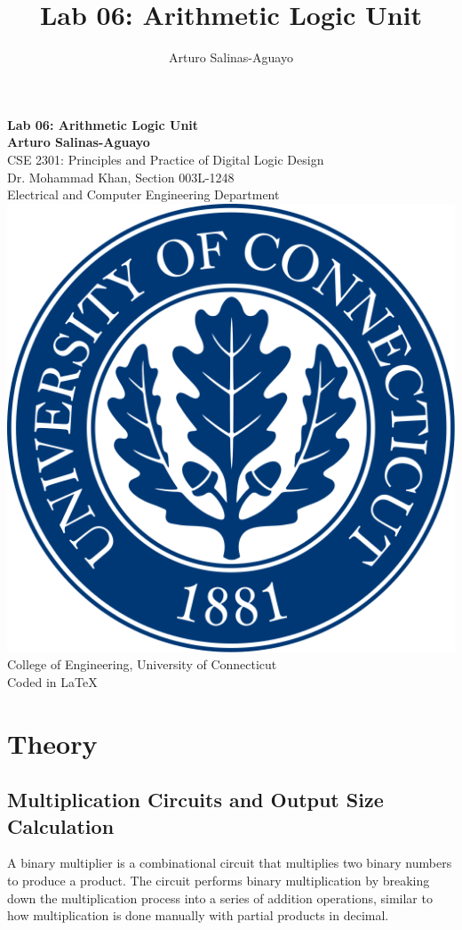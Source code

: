 \documentclass[12pt]{article}
\author{Arturo Salinas-Aguayo}
\title{Lab 06: Arithmetic Logic Unit}
\begin{document}
\newcommand{\closure}[2][3]{%
	{}\mkern#1mu\overline{\mkern-#1mu#2}}
\newcommand\ncoverline[1]{\mkern1mu\overline{\mkern-1mu#1\mkern-1mu}\mkern1mu}
\begin{titlepage}
	\centering
	\vspace*{3cm}
	\huge\textbf{Lab 06: Arithmetic Logic Unit}\\
	\vspace{5cm}
	\Large\textbf{Arturo Salinas-Aguayo}\\
	\normalsize
	CSE 2301: Principles and Practice of Digital Logic Design\\
	Dr. Mohammad Khan, Section 003L-1248\\
	Electrical and Computer Engineering Department
	\vfill
	\includegraphics[scale=0.1]{uconnlogo}\\
	College of Engineering, University of Connecticut\\
	\scriptsize{Coded in \LaTeX}
	\vspace*{1cm}
\end{titlepage}
\section*{Theory}
\subsection*{Multiplication Circuits and Output Size Calculation}
A binary multiplier is a combinational circuit that multiplies two binary numbers to produce a product. The circuit performs binary multiplication by breaking down the multiplication process into a series of addition operations, similar to how multiplication is done manually with partial products in decimal.
\end{document}
